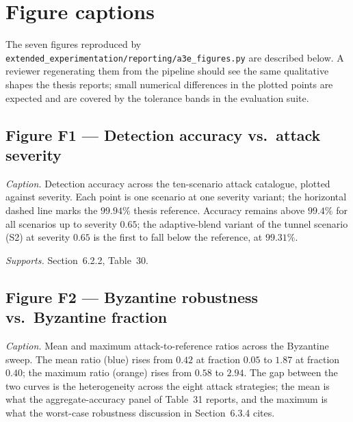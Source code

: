 %

\section{Figure captions}

The seven figures reproduced by
\texttt{extended\_experimentation/reporting/a3e\_figures.py} are
described below. A reviewer regenerating them from the pipeline
should see the same qualitative shapes the thesis reports; small
numerical differences in the plotted points are expected and are
covered by the tolerance bands in the evaluation suite.

\subsection*{Figure F1 --- Detection accuracy vs.\ attack severity}

\emph{Caption.} Detection accuracy across the ten-scenario attack
catalogue, plotted against severity. Each point is one scenario at one
severity variant; the horizontal dashed line marks the
$99.94\%$ thesis reference. Accuracy remains above $99.4\%$ for all
scenarios up to severity $0.65$; the adaptive-blend variant of the
tunnel scenario (S2) at severity $0.65$ is the first to fall below the
reference, at $99.31\%$.

\emph{Supports.} Section~6.2.2, Table~30.

\subsection*{Figure F2 --- Byzantine robustness vs.\ Byzantine fraction}

\emph{Caption.} Mean and maximum attack-to-reference ratios across
the Byzantine sweep. The mean ratio (blue) rises from $0.42$ at
fraction $0.05$ to $1.87$ at fraction $0.40$; the maximum ratio
(orange) rises from $0.58$ to $2.94$. The gap between the two curves
is the heterogeneity across the eight attack strategies; the mean is
what the aggregate-accuracy panel of Table~31 reports, and the
maximum is what the worst-case robustness discussion in
Section~6.3.4 cites.

